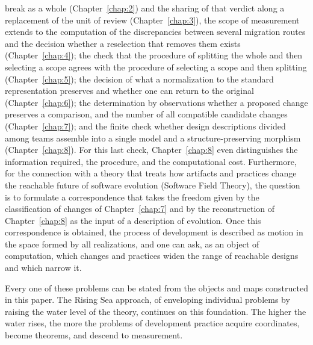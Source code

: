 \begin{enumerate}
break as a whole (Chapter~\ref{chap:2}) and the sharing of that verdict along a replacement
of the unit of review (Chapter~\ref{chap:3}), the scope of measurement extends to the
computation of the discrepancies between several migration routes and the decision whether a
reselection that removes them exists (Chapter~\ref{chap:4}); the check that the procedure of
splitting the whole and then selecting a scope agrees with the procedure of selecting a
scope and then splitting (Chapter~\ref{chap:5}); the decision of what a normalization to the
standard representation preserves and whether one can return to the original
(Chapter~\ref{chap:6}); the determination by observations whether a proposed change
preserves a comparison, and the number of all compatible candidate changes
(Chapter~\ref{chap:7}); and the finite check whether design descriptions divided among teams
assemble into a single model and a structure-preserving morphism (Chapter~\ref{chap:8}).
For this last check, Chapter~\ref{chap:8} even distinguishes the information
required, the procedure, and the computational cost.
Furthermore, for the connection with a theory that treats how artifacts and practices change
the reachable future of software evolution (Software Field Theory), the question is to
formulate a correspondence that takes the freedom given by the classification of changes of
Chapter~\ref{chap:7} and by the reconstruction of Chapter~\ref{chap:8} as the input of a
description of evolution. Once this correspondence is obtained, the process of development
is described as motion in the space formed by all realizations, and one can ask, as an
object of computation, which changes and practices widen the range of reachable designs and
which narrow it.
\end{enumerate}

Every one of these problems can be stated from the objects and maps constructed in this
paper. The Rising Sea approach, of enveloping individual problems by raising the water level
of the theory, continues on this foundation. The higher the water rises, the more the problems
of development practice acquire coordinates, become theorems, and descend to measurement.
